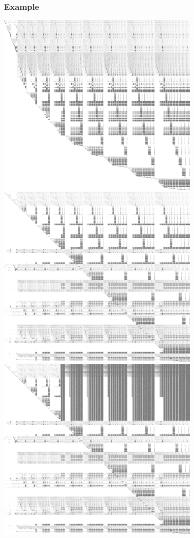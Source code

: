 \documentclass[11pt]{beamer}
\begin{document}
\begin{frame}[allowframebreaks]
\frametitle{Example}
\begin{center}
\vspace{-1.2em}
\includegraphics[width=0.75\textwidth]{./hfe_25_5_echelonize_step_000.png}\\\framebreak
\includegraphics[width=0.75\textwidth]{./hfe_25_5_echelonize_step_001.png}\\\framebreak
\includegraphics[width=0.75\textwidth]{./hfe_25_5_echelonize_step_002.png}\\\framebreak

\end{center}
\end{frame}
\end{document}
